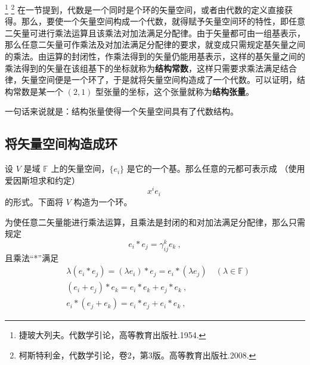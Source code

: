
\footnote{捷玻大列夫。代数学引论，高等教育出版社.1954.}
\footnote{柯斯特利金，代数学引论，卷2，第3版。高等教育出版社.2008.} 在一节提到，代数是一个同时是个环的矢量空间，或者由代数的定义直接获得。那么，要使一个矢量空间构成一个代数，就得赋予矢量空间环的特性，即任意二矢量可进行乘法运算且该乘法对加法满足分配律。由于矢量都可由一组基表示，那么任意二矢量可作乘法及对加法满足分配律的要求，就变成只需规定基矢量之间的乘法。由运算的封闭性，作乘法得到的矢量仍能用基表示，这样的基矢量之间的乘法得到的矢量在该组基下的坐标就称为\textbf{结构常数}，这样只需要求乘法满足结合律，矢量空间便是一个环了，于是就将矢量空间构造成了一个代数。可以证明，结构常数是某一个 $(2,1)$ 型张量的坐标，这个张量就称为\textbf{结构张量}。 

一句话来说就是：结构张量使得一个矢量空间具有了代数结构。

\subsection{将矢量空间构造成环}
设 $V$ 是域 $\mathbb F$ 上的矢量空间，$\{e_i\}$ 是它的一个基。那么任意的元都可表示成 （使用爱因斯坦求和约定）
\begin{equation}
x^i e_i~
\end{equation}
的形式。下面将 $V$ 构造为一个环。

为使任意二矢量能进行乘法运算，且乘法是封闭的和对加法满足分配律，那么只需规定
\begin{equation}\label{eq_STAlg_1}
e_i*e_j=\gamma_{ij}^k e_k~,
\end{equation}
且乘法“*”满足
\begin{equation}
\begin{aligned}
&\lambda(e_i*e_j)=(\lambda e_i)*e_j=e_i*(\lambda e_j)\quad (\lambda\in\mathbb F)\\
&(e_i+e_j)*e_k=e_i*e_k+e_j*e_k~,\\
&e_i*(e_j+e_k)=e_i*e_j+e_i*e_k~,
\end{aligned}
\end{equation}

